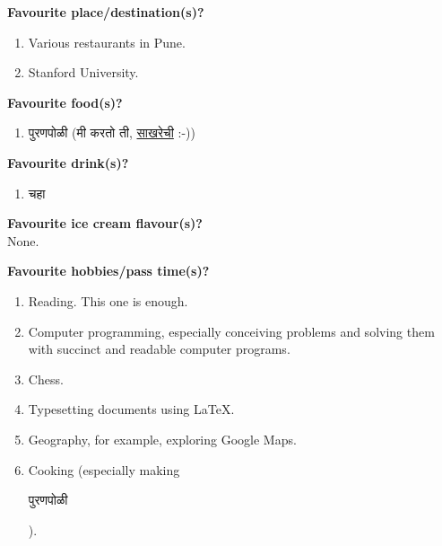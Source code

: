 \documentclass[17pt]{extarticle}  %
\begin{document}
\begin{enumerate}
\begin{english}
\begin{english}
\end{english}

\item \textbf{Favourite place/destination(s)?}\\

\begin{enumerate}
\item Various restaurants in Pune.
\item Stanford University.
\end{enumerate}

\item\textbf{Favourite food(s)?}\\
\begin{enumerate}
\item \begin{marathi}पुरणपोळी (मी करतो ती, \href{https://github.com/kedarmhaswade/writings/blob/main/marathi/puraNa-poLii/saakharechii-puraNapoLii.pdf}{साखरेची} :-))\end{marathi}
\end{enumerate}

\item\textbf{Favourite drink(s)?}\\
\begin{enumerate}
\item \begin{marathi}चहा\end{marathi}
\end{enumerate}

\item\textbf{Favourite ice cream flavour(s)?}\\
None.

\item\textbf{Favourite hobbies/pass time(s)?}\\
\begin{enumerate}
\item Reading. This one is enough.
\item Computer programming, especially conceiving problems and solving them with succinct and readable computer programs.
\item Chess.
\item Typesetting documents using \LaTeX.
\item Geography, for example, exploring Google Maps.
\item Cooking (especially making \begin{marathi}पुरणपोळी\end{marathi}).
\end{enumerate}


\end{english}
\end{enumerate}
\end{document}
